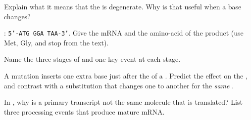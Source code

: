 \begin{exercise}[$\star\star$]\label{exo:g11:gene-expression:6}
Explain what it means that the  is degenerate. Why is that useful
when a  base changes?
\end{exercise}

\begin{exercise}[$\star\star$]\label{exo:g11:gene-expression:7}
: \texttt{5'-ATG GGA TAA-3'}. Give the mRNA and the amino-acid
 of the  product (use Met, Gly, and stop from the text).
\end{exercise}

\begin{exercise}[$\star\star$]\label{exo:g11:gene-expression:8}
Name the three stages of  and one key event at each stage.
\end{exercise}

\begin{exercise}[$\star\star\star$]\label{exo:g11:gene-expression:9}
A mutation inserts one extra base just after the  of a . Predict
the effect on the , and contrast with a substitution that changes one
 to another  for the \emph{same} .
\end{exercise}

\begin{exercise}[$\star\star\star$]\label{exo:g11:gene-expression:10}
In , why is a primary transcript not the same molecule that is
translated? List three processing events that produce mature mRNA.
\end{exercise}

